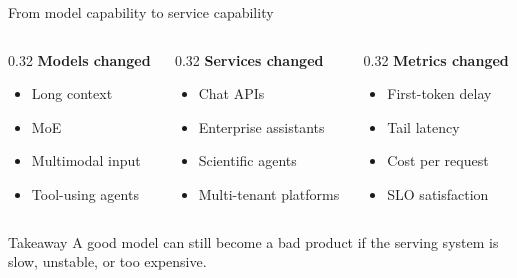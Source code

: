 \documentclass[aspectratio=169,11pt]{beamer}
\begin{document}
\begin{frame}{From model capability to service capability}
  \begin{columns}[T,totalwidth=\textwidth]
    \begin{column}{0.32\textwidth}
      \textbf{\textcolor{HUSTBlue}{Models changed}}
      \begin{itemize}
        \item Long context
        \item MoE
        \item Multimodal input
        \item Tool-using agents
      \end{itemize}
    \end{column}
    \begin{column}{0.32\textwidth}
      \textbf{\textcolor{HUSTBlue}{Services changed}}
      \begin{itemize}
        \item Chat APIs
        \item Enterprise assistants
        \item Scientific agents
        \item Multi-tenant platforms
      \end{itemize}
    \end{column}
    \begin{column}{0.32\textwidth}
      \textbf{\textcolor{HUSTBlue}{Metrics changed}}
      \begin{itemize}
        \item First-token delay
        \item Tail latency
        \item Cost per request
        \item SLO satisfaction
      \end{itemize}
    \end{column}
  \end{columns}
  \vspace{0.42cm}
  \begin{block}{Takeaway}
    A good model can still become a bad product if the serving system is slow, unstable, or too expensive.
  \end{block}
\end{frame}
\end{document}
